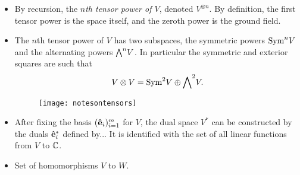 \begin{itemize}
			\item By recursion, the \emph{$n$th tensor power of $V$}, denoted $V^{\otimes n}$. By definition, the first tensor power is the space itself, and the zeroth power is the ground field.
			
			\item The $n$th tensor power of $V$ has two subspaces, the symmetric powers $\text{Sym}^n V$ and the alternating powers ${\bigwedge}^n V$. In particular the symmetric and exterior squares are such that
			\begin{align*}
				V \otimes V = \text{Sym}^2 V \oplus {\bigwedge}^2 V.
			\end{align*}
			
			\begin{figure}[hbt!]
				\centering
				\texttt{[image: notesontensors]}
				\caption{}
				\label{fig:notesontensors}
			\end{figure}
			
			
			\item After fixing the basis $(\mathbf{\hat{e}}_i)_{i=1}^m$ for $V$, the dual space $V^*$ can be constructed by the duals $\mathbf{\hat{e}}_i^*$ defined by... It is identified with the set of all linear functions from $V$ to $\mathbb{C}$.
			
			\item Set of homomorphisms $V$ to $W$.
			
		\end{itemize} 
		
	

		
		
		
